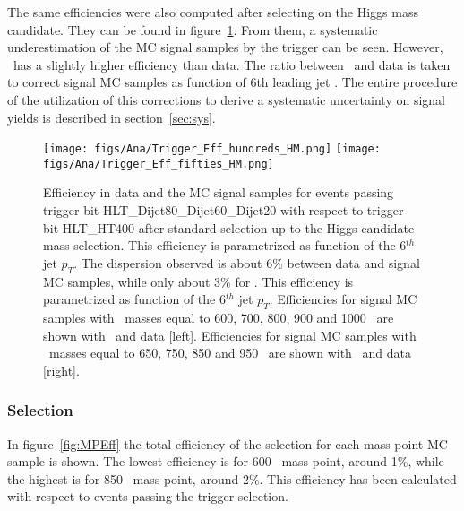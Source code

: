 The same efficiencies were also computed after selecting on the Higgs mass candidate. They can be found in figure~\ref{fig:TrigEffPostMH}. From them, a systematic underestimation of the MC signal samples by the trigger can be seen. However, \ttbar~has a slightly higher efficiency than data. The ratio between \ttbar~and data is taken to correct signal MC samples as function of 6th leading jet \pt. The entire procedure of the utilization of this corrections to derive a systematic uncertainty on signal yields is described in section~\ref{sec:sys}. %

\begin{figure}[!Hhtbp]
  \begin{center}
    \texttt{[image: figs/Ana/Trigger\_Eff\_hundreds\_HM.png]}
    \texttt{[image: figs/Ana/Trigger\_Eff\_fifties\_HM.png]}
    \caption{Efficiency in data and the MC signal samples for events passing trigger bit HLT\_Dijet80\_Dijet60\_Dijet20 with respect to trigger bit HLT\_HT400 after standard selection up to the Higgs-candidate mass selection. This efficiency is parametrized as function of the 6$^{th}$ jet $p_{T}$. The dispersion observed is about 6\% between data and signal MC samples, while only about 3\%  for \ttbar. This efficiency is parametrized as function of the 6$^{th}$ jet $p_{T}$. Efficiencies for signal MC samples with \Tp~masses equal to 600, 700, 800, 900 and 1000 \GeVcc~are shown with \ttbar~and data [left]. Efficiencies for signal MC samples with \Tp~masses equal to 650, 750, 850 and 950 \GeVcc~are shown with \ttbar~and data [right].}
    \label{fig:TrigEffPostMH}
  \end{center}
\end{figure}

\subsubsection{Selection}
\label{sec:seleff}

In figure~\ref{fig:MPEff} the total efficiency of the selection for each mass point MC sample is shown. The lowest efficiency is for 600 \GeVcc~mass point, around 1\%, while the highest is for 850 \GeVcc~mass point, around 2\%. This efficiency has been calculated with respect to events passing the trigger selection.  

